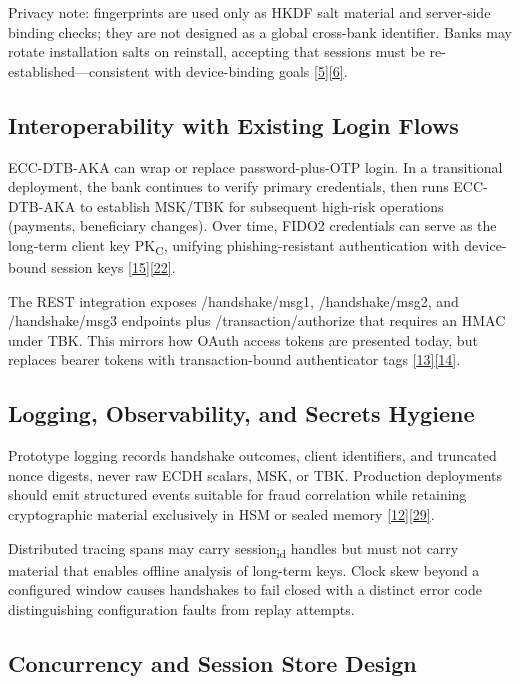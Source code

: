 \indent Privacy note: fingerprints are used only as HKDF salt material and server-side binding checks; they are not designed as a global cross-bank identifier. Banks may rotate installation salts on reinstall, accepting that sessions must be re-established---consistent with device-binding goals \hyperref[ref:5]{[5]}\hyperref[ref:6]{[6]}.

\subsection{Interoperability with Existing Login Flows}

\indent ECC-DTB-AKA can wrap or replace password-plus-OTP login. In a transitional deployment, the bank continues to verify primary credentials, then runs ECC-DTB-AKA to establish MSK/TBK for subsequent high-risk operations (payments, beneficiary changes). Over time, FIDO2 credentials can serve as the long-term client key PK\textsubscript{C}, unifying phishing-resistant authentication with device-bound session keys \hyperref[ref:15]{[15]}\hyperref[ref:22]{[22]}.

\indent The REST integration exposes /handshake/msg1, /handshake/msg2, and /handshake/msg3 endpoints plus /transaction/authorize that requires an HMAC under TBK. This mirrors how OAuth access tokens are presented today, but replaces bearer tokens with transaction-bound authenticator tags \hyperref[ref:13]{[13]}\hyperref[ref:14]{[14]}.

\subsection{Logging, Observability, and Secrets Hygiene}

\indent Prototype logging records handshake outcomes, client identifiers, and truncated nonce digests, never raw ECDH scalars, MSK, or TBK. Production deployments should emit structured events suitable for fraud correlation while retaining cryptographic material exclusively in HSM or sealed memory \hyperref[ref:12]{[12]}\hyperref[ref:29]{[29]}.

\indent Distributed tracing spans may carry session\textsubscript{id} handles but must not carry material that enables offline analysis of long-term keys. Clock skew beyond a configured window causes handshakes to fail closed with a distinct error code distinguishing configuration faults from replay attempts.

\subsection{Concurrency and Session Store Design}

